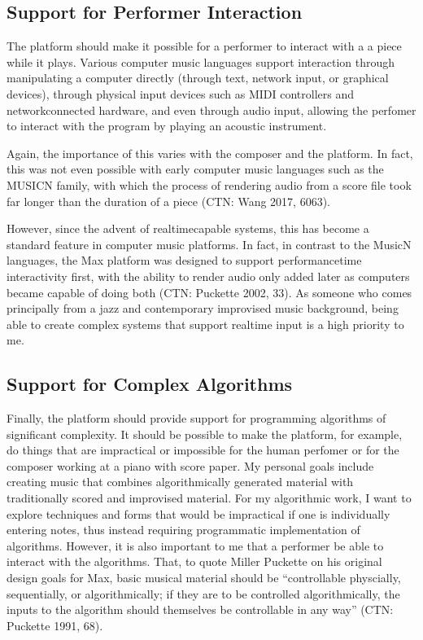 \documentclass[letterpaper,10pt,english]{sphinxmanual}
\begin{document}
\subsection{Support for Performer Interaction}
\label{\detokenize{background:support-for-performer-interaction}}
\sphinxAtStartPar
The platform should make it possible for a performer to interact with a
a piece while it plays. Various computer music languages support interaction through
manipulating a computer directly (through text, network input, or graphical devices),
through physical input devices such as MIDI controllers and network\sphinxhyphen{}connected hardware,
and even through audio input, allowing the perfomer to interact with the program by playing
an acoustic instrument.

\sphinxAtStartPar
Again, the importance of this varies with the composer and the platform.
In fact, this was not even possible with early computer music languages such
as the MUSIC\sphinxhyphen{}N family, with which the process of rendering audio from a score file
took far longer than the duration of a piece (CTN: Wang 2017, 60\sphinxhyphen{}63).

\sphinxAtStartPar
However, since the advent of realtime\sphinxhyphen{}capable systems, this has become a
standard feature in computer music platforms.
In fact, in contrast to the Music\sphinxhyphen{}N languages, the Max platform was designed
to support performance\sphinxhyphen{}time interactivity first, with the ability to render audio only added later
as computers became capable of doing both (CTN: Puckette 2002, 33).
As someone who comes principally from a jazz and contemporary improvised music
background, being able to create complex systems that support realtime input is a high priority to me.


\subsection{Support for Complex Algorithms}
\label{\detokenize{background:support-for-complex-algorithms}}
\sphinxAtStartPar
Finally, the platform should provide support for programming algorithms of significant complexity.
It should be possible to make the platform, for example, do things that are impractical
or impossible for the human perfomer or for the composer working at a piano with score paper.
My personal goals include creating music that combines algorithmically generated
material with traditionally scored and improvised material.
For my algorithmic work, I want to explore techniques and forms that would be impractical
if one is individually entering notes, thus instead requiring programmatic implementation of
algorithms.
However, it is also important to me that a performer be able to interact with the algorithms.
That, to quote Miller Puckette on his original design goals for Max,
basic musical material should be “controllable physcially, sequentially, or algorithmically;
if they are to be controlled algorithmically, the inputs to the algorithm should
themselves be controllable in any way” (CTN: Puckette 1991, 68).
\end{document}
